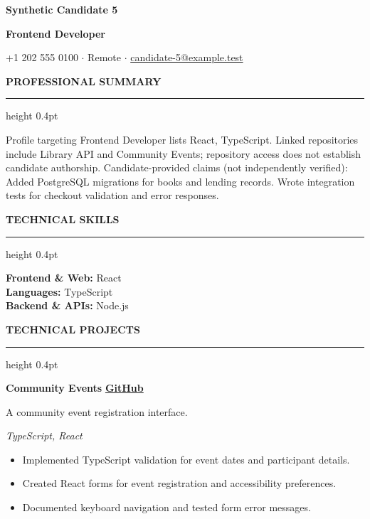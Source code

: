 \documentclass[10pt,letterpaper]{article}
\newcommand{\atsHeaderToSection}{10pt}
\newcommand{\atsSectionToSection}{9pt}
\newcommand{\atsHeadingToContent}{3pt}
\newcommand{\atsProjectTitleToTech}{1.5pt}
\newcommand{\atsProjectTechToBullets}{2.5pt}
\newcommand{\atsBulletToBullet}{1.2pt}
\newcommand{\atssection}[1]{%
  \vspace{\atsSectionToSection}%
  {\noindent\large\bfseries\uppercase{#1}}\par
  \vspace{1.5pt}\hrule height 0.4pt\vspace{\atsHeadingToContent}%
}
\newcommand{\atsfirstsection}[1]{%
  \vspace{\atsHeaderToSection}%
  {\noindent\large\bfseries\uppercase{#1}}\par
  \vspace{1.5pt}\hrule height 0.4pt\vspace{\atsHeadingToContent}%
}
\begin{document}
{\centering
  {\Huge \textbf{Synthetic Candidate 5}}\par
  \vspace{3pt}
  {\large \textbf{Frontend Developer}}\par
  \vspace{3pt}
  {\small +1 202 555 0100 $\cdot$ Remote $\cdot$ \href{mailto:candidate-5@example.test}{candidate-5@example.test}}\par
}

\atsfirstsection{Professional Summary}
Profile targeting Frontend Developer lists React, TypeScript. Linked repositories include Library API and Community Events; repository access does not establish candidate authorship. Candidate-provided claims (not independently verified): Added PostgreSQL migrations for books and lending records. Wrote integration tests for checkout validation and error responses.\par

\atssection{Technical Skills}
\textbf{Frontend \& Web:} React\\
\textbf{Languages:} TypeScript\\
\textbf{Backend \& APIs:} Node.js\par

\atssection{Technical Projects}
\textbf{Community Events} \hfill {\small \href{https://github.com/synthetic-fixture/project-2}{\textbf{GitHub}}}\par
A community event registration interface.\par
\vspace{\atsProjectTitleToTech}
{\textit{TypeScript, React}}\par
\vspace{\atsProjectTechToBullets}
\begin{itemize}
\setlength{\itemsep}{\atsBulletToBullet}\setlength{\parskip}{0pt}\setlength{\parsep}{0pt}\setlength{\topsep}{0pt}\setlength{\partopsep}{0pt}
  \item Implemented TypeScript validation for event dates and participant details.
  \item Created React forms for event registration and accessibility preferences.
  \item Documented keyboard navigation and tested form error messages.
\end{itemize}
\end{document}
